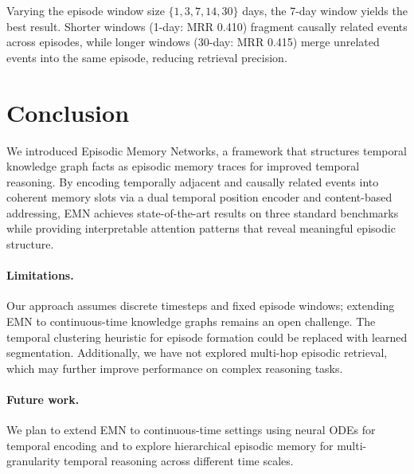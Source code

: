 \documentclass{article}
\begin{document}
Varying the episode window size $\{1, 3, 7, 14, 30\}$ days, the 7-day window yields the best result. Shorter windows (1-day: MRR 0.410) fragment causally related events across episodes, while longer windows (30-day: MRR 0.415) merge unrelated events into the same episode, reducing retrieval precision.

\section{Conclusion}
\label{sec:conclusion}

We introduced Episodic Memory Networks, a framework that structures temporal knowledge graph facts as episodic memory traces for improved temporal reasoning. By encoding temporally adjacent and causally related events into coherent memory slots via a dual temporal position encoder and content-based addressing, EMN achieves state-of-the-art results on three standard benchmarks while providing interpretable attention patterns that reveal meaningful episodic structure.

\paragraph{Limitations.} Our approach assumes discrete timesteps and fixed episode windows; extending EMN to continuous-time knowledge graphs remains an open challenge. The temporal clustering heuristic for episode formation could be replaced with learned segmentation. Additionally, we have not explored multi-hop episodic retrieval, which may further improve performance on complex reasoning tasks.

\paragraph{Future work.} We plan to extend EMN to continuous-time settings using neural ODEs for temporal encoding and to explore hierarchical episodic memory for multi-granularity temporal reasoning across different time scales.

\clearpage



\end{document}
